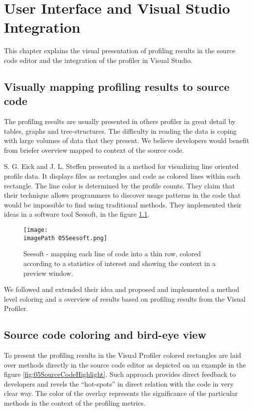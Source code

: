 \chapter{User Interface and Visual Studio Integration }
\label{chap:VPUIandSI}


This chapter explains the visual presentation of profiling results in the source code editor and the integration of the profiler in Visual Studio.

\section{Visually mapping profiling results to source code}
The profiling results are usually presented in others profiler in great detail by tables, graphs and tree-structures. The difficulty in reading the data is coping with large volumes of data that they present. We believe developers would benefit from briefer overview mapped to context of the source code.

S. G. Eick and J. L. Steffen presented in \cite{EickSteffen92} a method for visualizing line oriented profile data. It displays files as rectangles and code as colored lines within each rectangle. The line color is determined by the profile counts. They claim that their technique allows programmers to discover usage patterns in the code that would be impossible to find using traditional methods. They implemented their ideas in a software tool Seesoft, in the figure \ref{fig:05SeeSoft}.

\begin{figure}
	\centering
		\texttt{[image: \\imagePath 05Seesoft.png]}
		\caption{Seesoft - mapping each line of code into a thin row, colored according to a statistics of interest and showing the context in a preview window.}
	\label{fig:05SeeSoft}
\end{figure}


We followed and extended their idea and proposed and implemented a method level coloring and a overview of results based on profiling results from the Visual Profiler. 

\section{Source code coloring and bird-eye view}
To present the profiling results in the Visual Profiler colored rectangles are laid over methods directly in the source code editor as depicted on an example in the figure \ref{fig:05SourceCodeHighlight}. Such approach provides direct feedback to developers and revels the ``hot-spots'' in direct relation with the code in very clear way.  The color of the overlay represents the significance of the particular methods in the context of the profiling metrics.


